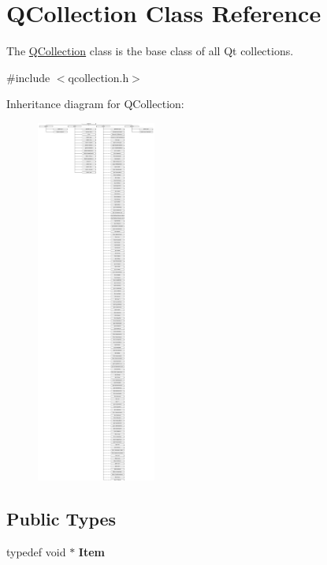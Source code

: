 \hypertarget{class_q_collection}{}\section{Q\+Collection Class Reference}
\label{class_q_collection}


The \mbox{\hyperlink{class_q_collection}{Q\+Collection}} class is the base class of all Qt collections.  




{\ttfamily \#include $<$qcollection.\+h$>$}

Inheritance diagram for Q\+Collection\+:\begin{figure}[H]
\begin{center}
\leavevmode
\includegraphics[height=12.000000cm]{class_q_collection}
\end{center}
\end{figure}
\subsection*{Public Types}
\begin{DoxyCompactItemize}
\item 
\mbox{\label{class_q_collection_ac6f3ddbf999e31fb797927f71ae6b5d7}} 
typedef void $\ast$ {\bfseries Item}
\end{DoxyCompactItemize}
